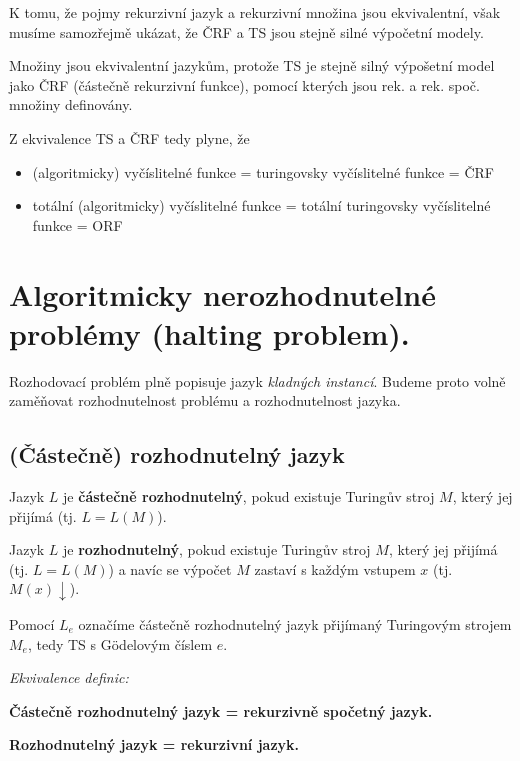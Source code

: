 \documentclass[11pt]{report} %
\numberwithin{equation}{section}
\begin{document}
K tomu, že pojmy rekurzivní jazyk a rekurzivní množina jsou ekvivalentní, však musíme samozřejmě ukázat, že ČRF a TS jsou stejně silné výpočetní modely. 


Množiny jsou ekvivalentní jazykům, protože TS je stejně silný výpošetní model jako ČRF (částečně rekurzivní funkce), pomocí kterých jsou rek. a rek. spoč. množiny definovány.


Z ekvivalence TS a ČRF tedy plyne, že 
\begin{itemize}
	\item (algoritmicky) vyčíslitelné funkce = turingovsky vyčíslitelné funkce = ČRF
	\item totální (algoritmicky) vyčíslitelné funkce = totální turingovsky vyčíslitelné funkce = ORF
\end{itemize}










\section{Algoritmicky nerozhodnutelné problémy (halting problem).}
Rozhodovací problém plně popisuje jazyk \textit{kladných instancí}. Budeme proto volně zaměňovat rozhodnutelnost problému a rozhodnutelnost jazyka.

\subsection{(Částečně) rozhodnutelný jazyk}
Jazyk $L$ je \textbf{částečně rozhodnutelný}, pokud existuje Turingův stroj $M$, který jej přijímá (tj. $L = L(M)$).

Jazyk $L$ je \textbf{rozhodnutelný}, pokud existuje Turingův stroj $M$, který jej přijímá (tj. $L = L(M)$) a navíc se výpočet $M$ zastaví s každým vstupem $x$ (tj. $M(x){\downarrow}$).

Pomocí $L_e$ označíme částečně rozhodnutelný jazyk přijímaný Turingovým strojem $M_e$, tedy TS s Gödelovým číslem $e$. 

\medskip
\noindent \textit{Ekvivalence definic:}

\textbf{Částečně rozhodnutelný jazyk = rekurzivně spočetný jazyk.}

\textbf{Rozhodnutelný jazyk = rekurzivní jazyk.}
\end{document}
